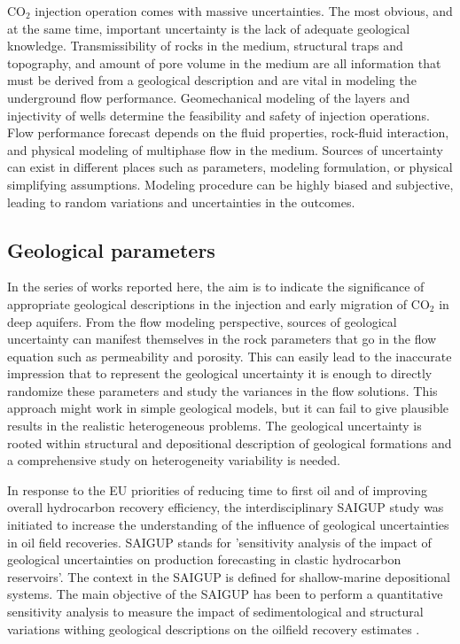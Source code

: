 $\mbox{CO}_2$ injection operation comes with massive uncertainties. The most obvious, and at  the same time, important uncertainty is the lack of adequate geological knowledge. Transmissibility of rocks in the medium, structural traps and topography, and amount of pore volume in the medium are all information that must be derived from a geological description and are vital in modeling the underground flow performance. Geomechanical modeling of the layers and injectivity of wells determine the feasibility and safety of injection operations. Flow performance forecast depends on the fluid properties, rock-fluid interaction, and physical modeling of multiphase flow in the medium. Sources of uncertainty can exist in different places such as parameters, modeling formulation, or physical simplifying assumptions. Modeling procedure can be highly biased and subjective, leading to random variations and uncertainties in the outcomes.


\subsection{Geological parameters}

In the series of works reported here, the aim is to indicate the significance of appropriate geological descriptions in the injection and early migration of $\mbox{CO}_2$ in deep aquifers.  From the flow modeling perspective, sources of geological uncertainty can manifest themselves in the rock parameters that go in the flow equation such as permeability and porosity. This can easily lead to the inaccurate impression that to represent the geological uncertainty it is enough to directly randomize these parameters and study the variances in the flow solutions. This approach might work in simple geological models, but it can fail to give plausible results in the realistic heterogeneous problems. The geological uncertainty is rooted within structural and depositional description of geological formations and a comprehensive study on heterogeneity variability is needed.

In response to the EU priorities of reducing time to first oil and of improving overall hydrocarbon recovery efficiency, the interdisciplinary SAIGUP study was initiated to increase the understanding of the influence of geological uncertainties in oil field recoveries. SAIGUP stands for 'sensitivity analysis of the impact of geological uncertainties on production forecasting in clastic hydrocarbon reservoirs'. The context in the SAIGUP is defined for shallow-marine depositional systems. The main objective of the SAIGUP has been to perform a quantitative sensitivity analysis to measure the impact of sedimentological and structural variations withing geological descriptions on the oilfield recovery estimates \cite{howell2008sedimentological,manzocchi2008sensitivity,matthews2008assessing}. 

